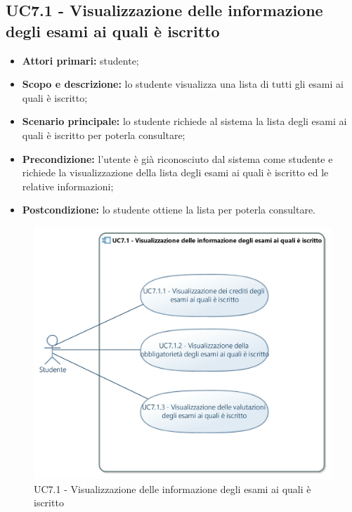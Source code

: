 \documentclass[AnalisiDeiRequisiti.tex]{subfiles}
\begin{document}
\subsection{UC7.1 - Visualizzazione delle informazione degli esami ai quali è iscritto}
\begin{itemize}
	\item \textbf{Attori primari:} studente;\\
	\item \textbf{Scopo e descrizione:} lo studente visualizza una lista di tutti gli esami ai quali è iscritto;\\
	\item \textbf{Scenario principale:} lo studente richiede al sistema la lista degli esami ai quali è iscritto per poterla consultare;\\
	\item \textbf{Precondizione:} l'utente è già riconosciuto dal sistema come studente e richiede la visualizzazione della lista degli esami ai quali è iscritto ed le relative informazioni;\\
	\item \textbf{Postcondizione:} lo studente ottiene la lista per poterla consultare.\\
\end{itemize}

\begin{figure}[H]
	\centering
	\includegraphics[width=1.0\linewidth]{UC7_1.jpg}
	\caption{UC7.1 - Visualizzazione delle informazione degli esami ai quali è iscritto}
	\label{fig:UC7.1 - Visualizzazione delle informazione degli esami ai quali e' iscritto} %
\end{figure}
\end{document}

